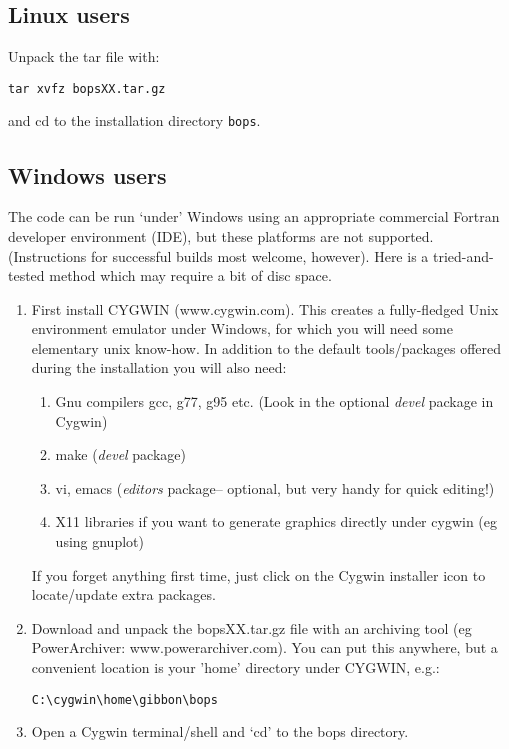 \documentclass[11pt]{article}
\begin{document}
\subsection*{Linux users}
Unpack the tar file with:
\begin{verbatim}
tar xvfz bopsXX.tar.gz
\end{verbatim}
and cd to the installation directory \texttt{bops}.

\subsection*{Windows users}

The code can be run `under' Windows using an appropriate commercial Fortran developer environment (IDE), but these
platforms are not supported.  (Instructions for successful builds most welcome, however).
Here is a tried-and-tested method which may require a bit of disc space.

\begin{enumerate}
\item First install CYGWIN (www.cygwin.com).  This creates a fully-fledged Unix environment emulator under Windows, 
for which you will need some elementary unix know-how.  
In addition to the default tools/packages offered during the installation you will also need:
\begin{enumerate}
	\item Gnu compilers gcc, g77, g95 etc. (Look in the optional {\it devel} package in Cygwin)
	\item make ({\it devel} package)
	\item vi, emacs ({\it editors} package-- optional, but very handy for quick editing!)
	\item X11 libraries if you want to generate graphics directly under cygwin (eg using gnuplot)
\end{enumerate}
If you forget anything first time, just click on the Cygwin installer icon to locate/update extra packages.
\item Download and unpack the bopsXX.tar.gz file with an archiving tool (eg PowerArchiver: www.powerarchiver.com).
You can put this anywhere, but a convenient location is your 'home' directory under CYGWIN, e.g.:

\begin{verbatim}
C:\cygwin\home\gibbon\bops
\end{verbatim}

\item Open a Cygwin terminal/shell and `cd' to the bops directory.
\end{enumerate}
\end{document}
